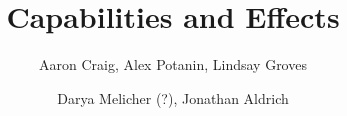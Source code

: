 \documentclass[sigplan,10pt,review]{acmart}\settopmatter{printfolios=true,printccs=false,printacmref=false}
\begin{document}
\title[Capabilities and Effects]{Capabilities and Effects}


\author{Aaron Craig, Alex Potanin, Lindsay Groves}

\author{Darya Melicher (?), Jonathan Aldrich}

\end{document}
